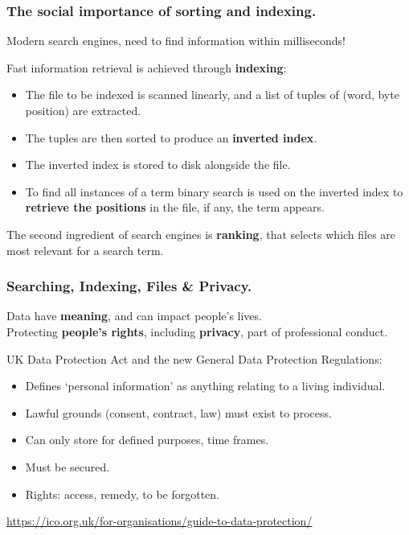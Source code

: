 \documentclass{beamer} %
\newcommand\emc[1]{\textcolor{midred}{\textbf{#1}}}
\begin{document}
\begin{frame}
\frametitle{The social importance of sorting and indexing.}

Modern search engines, need to find information within milliseconds!

\vspace{3mm}
Fast information retrieval is achieved through \emc{indexing}:
\begin{itemize}
	\item The file to be indexed is scanned linearly, and a list of tuples of (word, byte position) are extracted.
	\item The tuples are then sorted to produce an \emc{inverted index}.
	\item The inverted index is stored to disk alongside the file.
	\item To find all instances of a term binary search is used on the inverted index to \emc{retrieve the positions} in the file, if any, the term appears.
\end{itemize}

The second ingredient of search engines is \emc{ranking}, that selects which files are most relevant for a search term.
\end{frame}

\begin{frame}
\frametitle{Searching, Indexing, Files \& Privacy.}

Data have \emc{meaning}, and can impact people's lives.\\
Protecting \emc{people's rights}, including \emc{privacy}, part of professional conduct.

\vspace{3mm}
UK Data Protection Act and the new General Data Protection Regulations:
\begin{itemize}
	\item Defines `personal information' as anything relating to a living individual.
	\item Lawful grounds (consent, contract, law) must exist to process.
	\item Can only store for defined purposes, time frames.
	\item Must be secured.
	\item Rights: access, remedy, to be forgotten.
\end{itemize}

{\small \url{https://ico.org.uk/for-organisations/guide-to-data-protection/}}

\end{frame}
\end{document}
